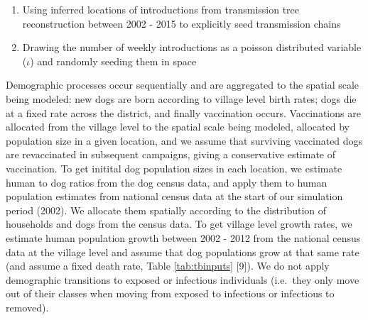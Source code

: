 \documentclass[
]{book}
\providecommand{\tightlist}{%
  \setlength{\itemsep}{0pt}\setlength{\parskip}{0pt}}
\begin{document}
\begin{enumerate}
\def\labelenumi{\arabic{enumi})}
\tightlist
\item
  Using inferred locations of introductions from transmission tree reconstruction between 2002 - 2015 to explicitly seed transmission chains
\item
  Drawing the number of weekly introductions as a poisson distributed variable (\(\iota\)) and randomly seeding them in space
\end{enumerate}

Demographic processes occur sequentially and are aggregated to the spatial scale being modeled: new dogs are born according to village level birth rates; dogs die at a fixed rate across the district, and finally vaccination occurs. Vaccinations are allocated from the village level to the spatial scale being modeled, allocated by population size in a given location, and we assume that surviving vaccinated dogs are revaccinated in subsequent campaigns, giving a conservative estimate of vaccination. To get initital dog population sizes in each location, we estimate human to dog ratios from the dog census data, and apply them to human population estimates from national census data at the start of our simulation period (2002). We allocate them spatially according to the distribution of households and dogs from the census data. To get village level growth rates, we estimate human population growth between 2002 - 2012 from the national census data at the village level and assume that dog populations grow at that same rate (and assume a fixed death rate, Table \ref{tab:tbinputs} {[}9{]}). We do not apply demographic transitions to exposed or infectious individuals (i.e.~they only move out of their classes when moving from exposed to infectious or infectious to removed).
\end{document}
